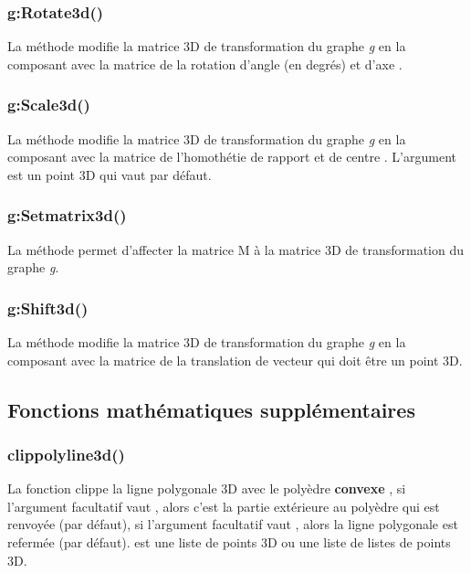 \subsubsection{g:Rotate3d()}

La méthode  modifie la matrice 3D de transformation du graphe \emph g en la composant avec la matrice de la rotation d'angle  (en degrés) et d'axe . 

\subsubsection{g:Scale3d()}

La méthode  modifie la matrice 3D de transformation du graphe \emph g en la composant avec la matrice de l'homothétie de rapport  et de centre . L'argument  est un point 3D qui vaut  par défaut.


\subsubsection{g:Setmatrix3d()}

La méthode  permet d'affecter la matrice \argu M à la matrice 3D de transformation du graphe \emph g.

\subsubsection{g:Shift3d()}

La méthode  modifie la matrice 3D de transformation du graphe \emph g en la composant avec la matrice de la translation de vecteur  qui doit être un point 3D.

\subsection{Fonctions mathématiques supplémentaires}

\subsubsection{clippolyline3d()}

La fonction  clippe la ligne polygonale 3D  avec le polyèdre \textbf{convexe} , si l'argument facultatif  vaut \true, alors c'est la partie extérieure au polyèdre qui est renvoyée (\false par défaut), si l'argument facultatif  vaut \true, alors la ligne polygonale est refermée (\false par défaut).  est une liste de points 3D ou une liste de listes de points 3D.

